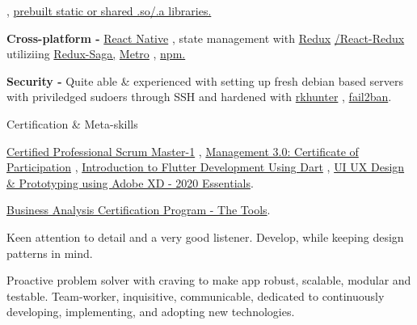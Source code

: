 \begin{skillsentries}
{\begin{skillsitems}
{        , 
        {\href{https://developer.android.com/ndk/guides/prebuilts}{prebuilt static or shared .so/.a libraries.}}}
        \item {\textbf{Cross-platform -} 
        {\href{https://facebook.github.io/react-native/}{React Native}}
        , state management with 
        {\href{https://redux.js.org}{Redux}}
        {\href{https://react-redux.js.org}{/React-Redux }}
        utiliziing 
        {\href{https://redux-saga.js.org}{Redux-Saga,}} 
        {\href{https://github.com/facebook/metro}{Metro}}
        ,
         {\href{https://www.npmjs.com}{npm.}}}
        \item {\textbf{Security - } Quite able \& experienced with setting up fresh debian based servers with priviledged sudoers through SSH and hardened with 
        {\href{http://rkhunter.sourceforge.net}{rkhunter}}
        ,
        {\href{https://www.fail2ban.org/wiki/index.php/Main_Page}{fail2ban}}.}
      \end{skillsitems}
    }

    
    \skillsentry
    {Certification \& Meta-skills} %
    {
      \begin{skillsitems} %
        \item {\href{https://drive.google.com/file/d/1jtFr7MJL4iW_3NKuQqpC7Jdc7T2w5R99/view?usp=sharing}{Certified Professional Scrum Master-1}
        , \href{https://drive.google.com/file/d/1lvfgnIfRZTEfw-g1Aq8YUFGmGqIw1ywU/view?usp=sharing}{Management 3.0: Certificate of Participation}
        , \href{https://drive.google.com/file/d/1U15zqely5Y4aUvPV6STjewR5rzNdkghe/view?usp=sharing}{Introduction to Flutter Development Using Dart} 
        , \href{http://ude.my/UC-1eea6925-e5cc-4c74-aa8f-a8205c341d13}{UI UX Design \& Prototyping using Adobe XD - 2020 Essentials}.}
        \item {\href{http://ude.my/UC-dbf43b00-3bb0-4607-b137-79c1425a9109}{Business Analysis Certification Program - The Tools}.}
        \item {Keen attention to detail and a very good listener. Develop, while keeping design patterns in mind.}
        \item {Proactive problem solver with craving to make app robust, scalable, modular and testable. Team-worker, inquisitive, communicable, 
        dedicated to continuously developing, implementing, and adopting new technologies.}
      \end{skillsitems}
      }
      
\end{skillsentries}
